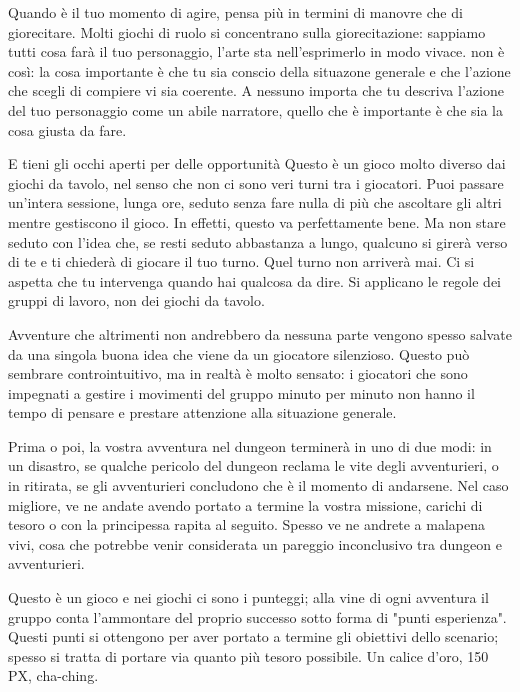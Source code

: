 Quando è il tuo momento di agire, pensa più in termini di manovre che di giorecitare. Molti giochi di ruolo si concentrano sulla giorecitazione: sappiamo tutti cosa farà il tuo personaggio, l'arte sta nell'esprimerlo in modo vivace. \dnd non è così: la cosa importante è che tu sia conscio della situazone generale e che l'azione che scegli di compiere vi sia coerente. A nessuno importa che tu descriva l'azione del tuo personaggio come un abile narratore, quello che è importante è che sia la cosa giusta da fare.

E tieni gli occhi aperti per delle opportunità Questo è un gioco molto diverso dai giochi da tavolo, nel senso che non ci sono veri turni tra i giocatori. Puoi passare un'intera sessione, lunga ore, seduto senza fare nulla di più che ascoltare gli altri mentre gestiscono il gioco. In effetti, questo va perfettamente bene. Ma non stare seduto con l'idea che, se resti seduto abbastanza a lungo, qualcuno si girerà verso di te e ti chiederà di giocare il tuo turno. Quel turno non arriverà mai. Ci si aspetta che tu intervenga quando hai qualcosa da dire. Si applicano le regole dei gruppi di lavoro, non dei giochi da tavolo.

Avventure che altrimenti non andrebbero da nessuna parte vengono spesso salvate da una singola buona idea che viene da un giocatore silenzioso. Questo può sembrare controintuitivo, ma in realtà è molto sensato: i giocatori che sono impegnati a gestire i movimenti del gruppo minuto per minuto non hanno il tempo di pensare e prestare attenzione alla situazione generale.




Prima o poi, la vostra avventura nel dungeon terminerà in uno di due modi: in un disastro, se qualche pericolo del dungeon reclama le vite degli avventurieri, o in ritirata, se gli avventurieri concludono che è il momento di andarsene. Nel caso migliore, ve ne andate avendo portato a termine la vostra missione, carichi di tesoro o con la principessa rapita al seguito. Spesso ve ne andrete a malapena vivi, cosa che potrebbe venir considerata un pareggio inconclusivo tra dungeon e avventurieri.

Questo è un gioco e nei giochi ci sono i punteggi; alla vine di ogni avventura il gruppo conta l'ammontare del proprio successo sotto forma di "punti esperienza". Questi punti si ottengono per aver portato a termine gli obiettivi dello scenario; spesso si tratta di portare via quanto più tesoro possibile. Un calice d'oro, 150 PX, cha-ching.

